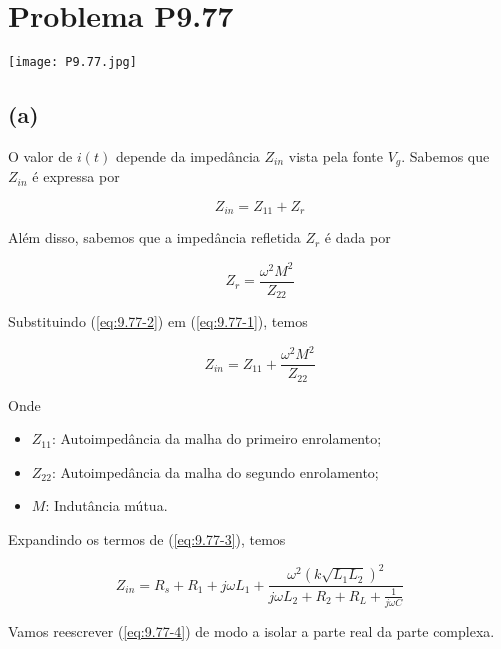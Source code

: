 \section*{Problema P9.77}

\begin{center}
    \texttt{[image: P9.77.jpg]}
\end{center}

\subsection*{(a)}

O valor de \(i(t)\) depende da impedância \(Z_{in}\) vista pela fonte \(V_{g}\).
Sabemos que \(Z_{in}\) é expressa por

\begin{equation}\label{eq:9.77-1}\tag{9.77-1}
    Z_{in} = Z_{11} + Z_{r}
\end{equation}

Além disso, sabemos que a impedância refletida \(Z_{r}\) é dada por

\begin{equation}\label{eq:9.77-2}\tag{9.77-2}
    Z_{r} = \frac{\omega^2M^2}{Z_{22}}
\end{equation}

Substituindo (\ref{eq:9.77-2}) em (\ref{eq:9.77-1}), temos

\begin{equation}\label{eq:9.77-3}\tag{9.77-3}
    Z_{in} = Z_{11} + \frac{\omega^2M^2}{Z_{22}}
\end{equation}

Onde
\begin{itemize}
    \item \(Z_{11}\): Autoimpedância da malha do primeiro enrolamento;
    \item \(Z_{22}\): Autoimpedância da malha do segundo enrolamento;
    \item \(M\): Indutância mútua.
\end{itemize}

Expandindo os termos de (\ref{eq:9.77-3}), temos

\begin{equation}\label{eq:9.77-4}\tag{9.77-4}
    Z_{in} = R_s + R_1 + j \omega L_1 + \frac{\omega^2(k\sqrt{L_1L_2})^2}{j\omega L_2 + R_2 + R_L + \frac{1}{j\omega C}}
\end{equation}

Vamos reescrever (\ref{eq:9.77-4}) de modo a isolar a parte real da parte complexa.

